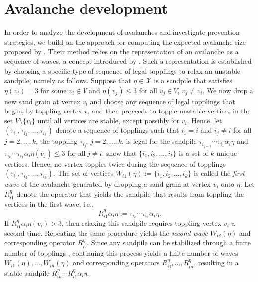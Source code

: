 \documentclass{article}
\begin{document}
\section{Avalanche development}
\label{Avalanche development}
In order to analyze the development of avalanches and investigate prevention strategies, we build on the approach for computing the expected avalanche size proposed by \citet{Dorso}. Their method relies on the representation of an avalanche as a sequence of waves, a concept introduced by \citet[p.~350]{Ivashkevich}. Such a representation is established by choosing a specific type of sequence of legal topplings to relax an unstable sandpile, namely as follows. Suppose that $\eta \in \mathcal{X}$ is a sandpile that satisfies $\eta(v_i) = 3$ for some $v_i \in V$ and $\eta(v_j) \leq 3$ for all $v_j \in V$, $v_j \neq v_i$. We now drop a new sand grain at vertex $v_i$ and choose any sequence of legal topplings that begins by toppling vertex $v_i$ and then proceeds to topple unstable vertices in the set $V \setminus \{v_i\}$ until all vertices are stable, except possibly for $v_i$. Hence, let $(\tau_{i_1}, \tau_{i_2}, \ldots, \tau_{i_k})$ denote a sequence of topplings such that $i_1 = i$ and $i_j \neq i$ for all $j = 2, \ldots, k$, the toppling $\tau_{i_j}$, $j = 2, \ldots, k$, is legal for the sandpile $\tau_{i_{j-1}} \cdots \tau_{i_1} \alpha_i \eta$ and $\tau_{i_k} \cdots \tau_{i_1} \alpha_i \eta(v_j)  \leq 3$ for all $j \neq i$. \citet{Ivashkevich} show that $\{i_1, i_2, \ldots, i_k\}$ is a set of $k$ unique vertices. Hence, no vertex topples twice during the sequence of topplings $(\tau_{i_1}, \tau_{i_2}, \ldots, \tau_{i_k})$. The set of vertices $W_{i1}(\eta) := \{i_1, i_2, \ldots, i_k\}$ is called the \textit{first wave} of the avalanche generated by dropping a sand grain at vertex $v_i$ onto $\eta$. Let $R^{\eta}_{i1}$ denote the operator that yields the sandpile that results from toppling the vertices in the first wave, i.e.,
\begin{equation*}
    R^{\eta}_{i1} \alpha_i \eta := \tau_{i_k} \cdots \tau_{i_1}\alpha_i \eta.
\end{equation*}
If $R^{\eta}_{i1} \alpha_i \eta(v_i) > 3$, then relaxing this sandpile requires toppling vertex $v_i$ a second time. Repeating the same procedure yields the \textit{second wave} $W_{i2}(\eta)$ and corresponding operator $R^{\eta}_{i2}$. Since any sandpile can be stabilized through a finite number of topplings \citep{Dhar}, continuing this process yields a finite number of waves $W_{i1}(\eta), \ldots, W_{in}(\eta)$ and corresponding operators $R^{\eta}_{i1}, \ldots, R^{\eta}_{in}$, resulting in a stable sandpile $R^{\eta}_{in} \cdots R^{\eta}_{i1} \alpha_i \eta$. 
\end{document}
